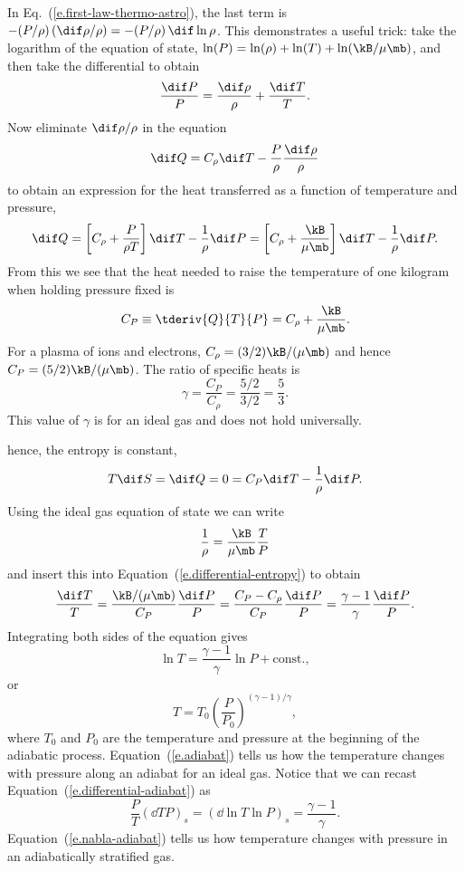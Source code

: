 In Eq.~(\ref{e.first-law-thermo-astro}), the last term is $-(P/\rho)\, (\dif\rho/\rho) = -(P/\rho)\,\dif\ln\rho$. This demonstrates a useful trick: take the logarithm of the equation of state, $\ln (P) = \ln(\rho) + \ln (T) + \ln (\kB/\mu\mb)$, and then take the differential to obtain
\[ \frac{\dif P}{P} = \frac{\dif\rho}{\rho} + \frac{\dif T}{T}. \]
Now eliminate $\dif\rho/\rho$ in the equation
\[ \dif Q = C_{\rho}\dif T - \frac{P}{\rho}\frac{\dif\rho}{\rho} \]
to obtain an expression for the heat transferred as a function of temperature and pressure,
\[ \dif Q = \left[C_{\rho} + \frac{P}{\rho T}\right]\dif T - \frac{1}{\rho}\dif P
	 = \left[C_{\rho} + \frac{\kB}{\mu\mb}\right]\dif T - \frac{1}{\rho}\dif P. \]
From this we see that the heat needed to raise the temperature of one kilogram when holding pressure fixed is
\begin{equation}\label{e.CP}
C_{P}\equiv \tderiv{Q}{T}{P} = C_{\rho} + \frac{\kB}{\mu\mb}.
\end{equation}
For a plasma of ions and electrons, $C_\rho = (3/2)\kB/(\mu\mb)$ and hence $C_P = (5/2)\kB/(\mu\mb)$.  The ratio of specific heats is
\begin{equation}\label{e.gamma}
    \gamma = \frac{C_P}{C_\rho} = \frac{5/2}{3/2} = \frac{5}{3}.
\end{equation}
This value of $\gamma$ is for an ideal gas and does not hold universally.

 hence, the entropy is constant,
\begin{equation}\label{e.differential-entropy}
    T\dif S = \dif Q = 0 = C_{P}\dif T - \frac{1}{\rho} \dif P.
\end{equation}
Using the ideal gas equation of state we can write 
\[
    \frac{1}{\rho} = \frac{\kB}{\mu\mb} \frac{T}{P}
\]
and insert this into Equation~(\ref{e.differential-entropy}) to obtain
\begin{equation}\label{e.differential-adiabat}
     \frac{\dif T}{T} = \frac{\kB/(\mu\mb)}{C_{P}}\frac{\dif P}{P} = \frac{C_{P}-C_{\rho}}{C_{P}} \frac{\dif P}{P} = \frac{\gamma-1}{\gamma}\frac{\dif P}{P}.
\end{equation}
Integrating both sides of the equation gives
\[ \ln T = \frac{\gamma-1}{\gamma}\ln P + \textrm{const.},\]
or 
\begin{equation}\label{e.adiabat}
 T = T_{0}\left(\frac{P}{P_{0}}\right)^{(\gamma-1)/\gamma},
\end{equation}
where $T_{0}$ and $P_{0}$ are the temperature and pressure at the beginning of the adiabatic process.
Equation~(\ref{e.adiabat}) tells us how the temperature changes with pressure along an adiabat for an ideal gas.  Notice that we can recast Equation~(\ref{e.differential-adiabat}) as
\begin{equation}
    \frac{P}{T}\left(\dd{T}{P}\right)_s = \left(\dd{\ln T}{\ln P}\right)_s = \frac{\gamma-1}{\gamma}.
\label{e.nabla-adiabat}
\end{equation}
Equation~(\ref{e.nabla-adiabat}) tells us how temperature changes with pressure in an adiabatically stratified gas.

